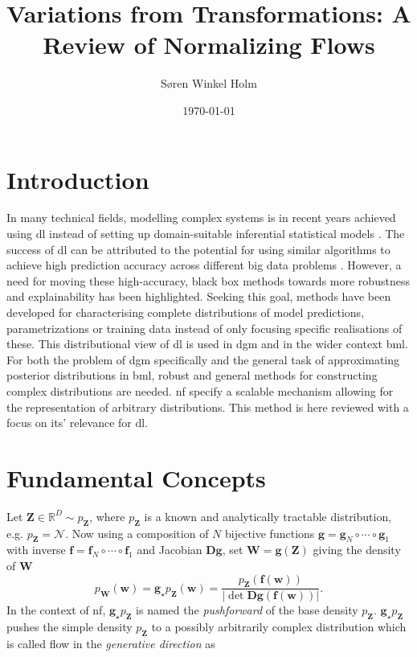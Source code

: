\documentclass[12pt,fleqn,twocolumn]{article}
\title{Variations from Transformations: A Review of Normalizing Flows}
\author{Søren Winkel Holm}
\date{\today}
\newcommand{\ginv}{\mathbf f}
\newcommand{\push}{\mathbf g_\star p_\mathbf Z}
\newcommand{\RR}{\ensuremath{\mathbb R}}
\begin{document}
\setlength{\headheight}{15pt}
\addtolength{\topmargin}{-2.5pt}

\maketitle
\thispagestyle{fancy}
\section*{Introduction}%
\label{sec:Introduction}
In many technical fields, modelling complex systems is in recent years achieved using \acrfull{dl} instead of setting up domain-suitable inferential statistical models \cite{bzdok2018point, breiman2001stat}.
The success of \acrshort{dl} can be attributed to the potential for using similar algorithms to achieve high prediction accuracy across different big data problems \cite{parloff2016dl}.
However, a need for moving these high-accuracy, black box methods towards more robustness and explainability has been highlighted.
Seeking this goal, methods have been developed for characterising complete distributions of model predictions, parametrizations or training data instead of only focusing specific realisations of these.
This distributional view of \acrshort{dl} is used in \acrfull{dgm} and in the wider context \acrfull{bml}.
For both the problem of \acrshort{dgm} specifically and the general task of approximating posterior distributions in \acrshort{bml}, robust and general methods for constructing complex distributions are needed.
\acrfull{nf} specify a scalable mechanism allowing for the representation of arbitrary distributions.
This method is here reviewed with a focus on its' relevance for \acrshort{dl}.

\section*{Fundamental Concepts}%
Let $ \mathbf Z \in \RR^D \sim p_\mathbf Z$,
where $p_\mathbf Z$ is a known and analytically tractable distribution, e.g. $p_\mathbf Z=\mathcal N$.
Now using a composition of $N$ bijective functions $\mathbf g=\mathbf g_N \circ \cdots \circ \mathbf g_1$ with inverse $\ginv=\ginv_N \circ \cdots \circ \ginv_1$ and Jacobian $\mathbf D\mathbf g$,
set $\mathbf W=\mathbf g (\mathbf Z)$ giving the density of $\mathbf W$
\begin{equation}\label{eq:dens}
    p_\mathbf W(\mathbf w)=\push(\mathbf w)=\frac{p_\mathbf Z \left(\ginv(\mathbf w)\right)}{\left| \det \mathbf D\mathbf g\left(\ginv(\mathbf w)\right) \right|}.
\end{equation}
In the context of \acrshort{nf}, $\push$ is named the \emph{pushforward} of the base density $p_\mathbf Z$.
$\push$ pushes the simple density $p_\mathbf Z$ to a possibly arbitrarily complex distribution which is called flow in the \emph{generative direction} \cite{koby2021nf} as
\end{document}
